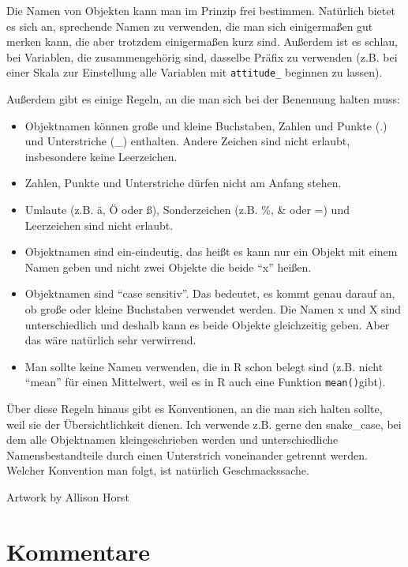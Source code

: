 \documentclass[
]{book}
\begin{document}
Die Namen von Objekten kann man im Prinzip frei bestimmen. Natürlich bietet es sich an, sprechende Namen zu verwenden, die man sich einigermaßen gut merken kann, die aber trotzdem einigermaßen kurz sind. Außerdem ist es schlau, bei Variablen, die zusammengehörig sind, dasselbe Präfix zu verwenden (z.B. bei einer Skala zur Einstellung alle Variablen mit \texttt{attitude\_} beginnen zu lassen).

Außerdem gibt es einige Regeln, an die man sich bei der Benennung halten muss:

\begin{itemize}
\item
  Objektnamen können große und kleine Buchstaben, Zahlen und Punkte (.) und Unterstriche (\_) enthalten. Andere Zeichen sind nicht erlaubt, insbesondere keine Leerzeichen.
\item
  Zahlen, Punkte und Unterstriche dürfen nicht am Anfang stehen.
\item
  Umlaute (z.B. ä, Ö oder ß), Sonderzeichen (z.B. \%, \& oder =) und Leerzeichen sind nicht erlaubt.
\item
  Objektnamen sind ein-eindeutig, das heißt es kann nur ein Objekt mit einem Namen geben und nicht zwei Objekte die beide ``x'' heißen.
\item
  Objektnamen sind ``case sensitiv''. Das bedeutet, es kommt genau darauf an, ob große oder kleine Buchstaben verwendet werden. Die Namen x und X sind unterschiedlich und deshalb kann es beide Objekte gleichzeitig geben. Aber das wäre natürlich sehr verwirrend.
\item
  Man sollte keine Namen verwenden, die in R schon belegt sind (z.B. nicht ``mean'' für einen Mittelwert, weil es in R auch eine Funktion \texttt{mean()}gibt).
\end{itemize}

Über diese Regeln hinaus gibt es Konventionen, an die man sich halten sollte, weil sie der Übersichtlichkeit dienen. Ich verwende z.B. gerne den snake\_case, bei dem alle Objektnamen kleingeschrieben werden und unterschiedliche Namensbestandteile durch einen Unterstrich voneinander getrennt werden. Welcher Konvention man folgt, ist natürlich Geschmackssache.

Artwork by Allison Horst

\hypertarget{kommentare}{%
\section{Kommentare}\label{kommentare}}
\end{document}
